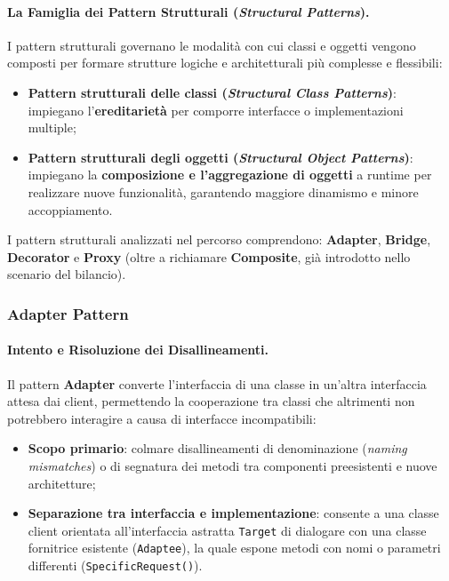 \documentclass[12pt]{extarticle}
\begin{document}

\paragraph{La Famiglia dei Pattern Strutturali (\textit{Structural Patterns}).}
I pattern strutturali governano le modalità con cui classi e oggetti vengono composti per formare strutture logiche e architetturali più complesse e flessibili:
\begin{itemize}
    \item \textbf{Pattern strutturali delle classi (\textit{Structural Class Patterns})}: impiegano l'\textbf{ereditarietà} per comporre interfacce o implementazioni multiple;
    \item \textbf{Pattern strutturali degli oggetti (\textit{Structural Object Patterns})}: impiegano la \textbf{composizione e l'aggregazione di oggetti} a runtime per realizzare nuove funzionalità, garantendo maggiore dinamismo e minore accoppiamento.
\end{itemize}
I pattern strutturali analizzati nel percorso comprendono: \textbf{Adapter}, \textbf{Bridge}, \textbf{Decorator} e \textbf{Proxy} (oltre a richiamare \textbf{Composite}, già introdotto nello scenario del bilancio).

\newpage

\subsubsection{Adapter Pattern}

\paragraph{Intento e Risoluzione dei Disallineamenti.}
Il pattern \textbf{Adapter} converte l'interfaccia di una classe in un'altra interfaccia attesa dai client, permettendo la cooperazione tra classi che altrimenti non potrebbero interagire a causa di interfacce incompatibili:
\begin{itemize}
    \item \textbf{Scopo primario}: colmare disallineamenti di denominazione (\textit{naming mismatches}) o di segnatura dei metodi tra componenti preesistenti e nuove architetture;
    \item \textbf{Separazione tra interfaccia e implementazione}: consente a una classe client orientata all'interfaccia astratta \texttt{Target} di dialogare con una classe fornitrice esistente (\texttt{Adaptee}), la quale espone metodi con nomi o parametri differenti (\texttt{SpecificRequest()}).
\end{itemize}
\end{document}
